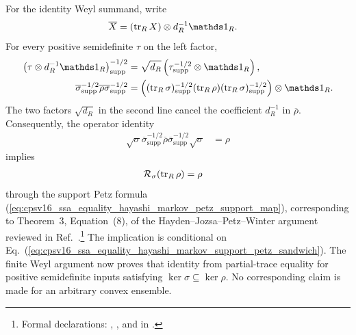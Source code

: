 \documentclass[11pt]{article}
\begin{document}
For the identity Weyl summand, write
\begin{align}
    \overline X
        &=(\tr_R X)\otimes d_R^{-1}\Id_R.
    \label{eq:cpsv16_ssa_equality_hayashi_markov_identity_weyl_average}
\end{align}
For every positive semidefinite $\tau$ on the left factor,
\begin{align}
    \left(\tau\otimes d_R^{-1}\Id_R\right)^{-1/2}_{\mathrm{supp}}
        &=
        \sqrt{d_R}
        \left(\tau^{-1/2}_{\mathrm{supp}}\otimes\Id_R\right),
    \label{eq:cpsv16_ssa_equality_hayashi_markov_mixed_support_inverse_sqrt}\\
    \overline\sigma^{-1/2}_{\mathrm{supp}}
    \overline\rho
    \overline\sigma^{-1/2}_{\mathrm{supp}}
        &=
        \left((\tr_R\sigma)^{-1/2}_{\mathrm{supp}}
            (\tr_R\rho)
            (\tr_R\sigma)^{-1/2}_{\mathrm{supp}}\right)\otimes\Id_R.
    \label{eq:cpsv16_ssa_equality_hayashi_markov_weyl_sandwich_reduction}
\end{align}
The two factors $\sqrt{d_R}$ in the second line cancel the coefficient
$d_R^{-1}$ in $\overline\rho$. Consequently, the operator identity
\begin{align}
    \sqrt{\sigma}
    \overline\sigma^{-1/2}_{\mathrm{supp}}
    \overline\rho
    \overline\sigma^{-1/2}_{\mathrm{supp}}
    \sqrt{\sigma}
        &=\rho
    \label{eq:cpsv16_ssa_equality_hayashi_markov_support_petz_sandwich}
\end{align}
implies
\begin{align}
    \mathcal R_\sigma(\operatorname{tr}_R\rho)
        &=\rho
    \label{eq:cpsv16_ssa_equality_hayashi_markov_raw_petz_recovery}
\end{align}
through the support Petz formula
(\ref{eq:cpsv16_ssa_equality_hayashi_markov_petz_support_map}), corresponding
to Theorem~3, Equation~(8), of the Hayden--Jozsa--Petz--Winter argument reviewed
in Ref.~\cite{Cirac2021Matrix}.\footnote{Formal declarations:
,
, and
 in
.}
The implication is conditional on
Eq.~(\ref{eq:cpsv16_ssa_equality_hayashi_markov_support_petz_sandwich}). The
finite Weyl argument now proves that identity from partial-trace equality for
positive semidefinite inputs satisfying
$\ker\sigma\subseteq\ker\rho$. No corresponding claim is made for an arbitrary
convex ensemble.
\end{document}
